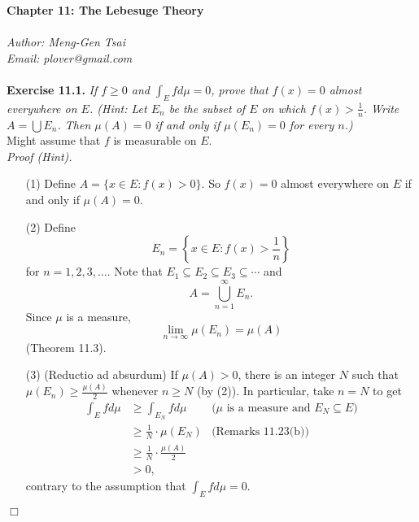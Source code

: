 \documentclass{article}
\begin{document}
\textbf{\Large Chapter 11: The Lebesuge Theory} \\\\



\emph{Author: Meng-Gen Tsai} \\
\emph{Email: plover@gmail.com} \\\\






\textbf{Exercise 11.1.}
\emph{If $f \geq 0$ and $\int_{E} f d\mu = 0$,
prove that $f(x) = 0$ almost everywhere on $E$.
(Hint: Let $E_n$ be the subset of $E$ on which $f(x) > \frac{1}{n}$.
Write $A = \bigcup E_n$.
Then $\mu(A) = 0$ if and only if $\mu(E_n) = 0$ for every $n$.)} \\

Might assume that $f$ is measurable on $E$. \\

\emph{Proof (Hint).}
\begin{enumerate}
\item[(1)]
Define $A = \{ x \in E : f(x) > 0 \}$.
So $f(x) = 0$ almost everywhere on $E$ if and only if $\mu(A) = 0$.

\item[(2)]
Define
\[
  E_n = \left\{ x \in E : f(x) > \frac{1}{n} \right\}
\]
for $n = 1,2,3,\ldots$.
Note that $E_1 \subseteq E_2 \subseteq E_3 \subseteq \cdots$ and
\[
  A = \bigcup_{n=1}^{\infty} E_n.
\]
Since $\mu$ is a measure,
\[
  \lim_{n \to \infty} \mu(E_n) = \mu(A)
\]
(Theorem 11.3).

\item[(3)]
(Reductio ad absurdum)
If $\mu(A)> 0$, there is an integer $N$ such that
$\mu(E_n) \geq \frac{\mu(A)}{2}$ whenever $n \geq N$ (by (2)).
In particular, take $n = N$ to get
\begin{align*}
  \int_E f d\mu
  &\geq \int_{E_N} f d\mu
    &\text{($\mu$ is a measure and $E_N \subseteq E$)}\\
  &\geq \frac{1}{N} \cdot \mu(E_N)
    &\text{(Remarks 11.23(b))} \\
  &\geq \frac{1}{N} \cdot \frac{\mu(A)}{2} \\
  & > 0,
\end{align*}
contrary to the assumption that $\int_{E} f d\mu = 0$.
\end{enumerate}
$\Box$ \\
\end{document}
